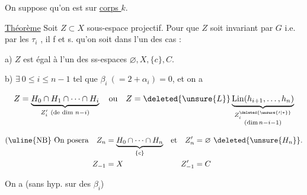 
On suppose qu'on est sur \uline{corps $k$}.

\uline{Théorème} Soit $Z\subset X$ sous-espace projectif.  Pour que $Z$ soit invariant par $G$ i.e. par les $\tau_i$ , il f et s. qu'on soit dans l'un des cas  :

a) $Z$ est égal à l'un des ss-espaces $\varnothing,X,\{c\},C$.

b) $\exists\ 0\le i\le n-1$ tel que $\beta_i\ (=2+\alpha_i)=0$, et on a

\[
Z=\underbrace{H_0\cap H_1\cap\cdots\cap H_i}_{Z'_i\ (\text{de dim }n-i)}
\quad\text{ou}\quad
Z=\deleted{\unsure{L}}\underbrace{\mathrm{Lin}(h_{i+1},\ldots,h_n)}_
 {\substack{Z_i^{\deleted{\unsure{\prime|*}}}\\(\dim n-i-1)}}
\]



\[
\begin{aligned}
(\text{\uline{NB} On posera}\quad Z_n&=\underbrace{H_0\cap\cdots\cap H_n}_{\{c\}}
 &\text{et}\quad Z'_n&=\varnothing\ \deleted{\unsure{H_n}}.\\
 Z_{-1}&=X &Z'_{-1}&=C
\end{aligned}
\]

On a (sans hyp. sur  des $\beta_i$)


